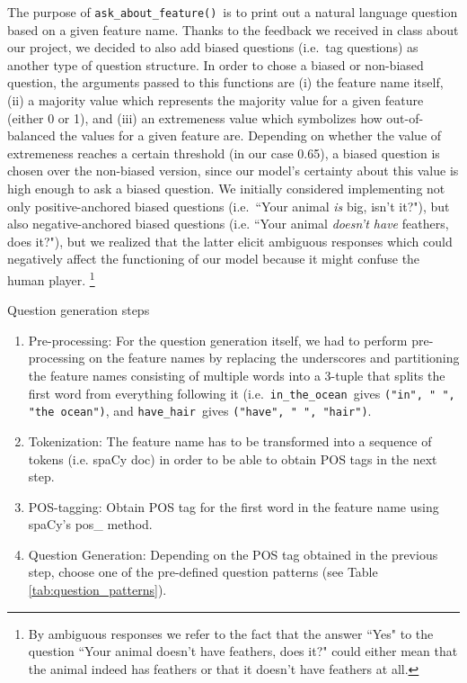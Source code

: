 \documentclass[11pt,a4paper]{article}
\newcommand{\havehair}{\texttt{have\_hair}}
\newcommand{\askaboutfeat}{\texttt{ask\_about\_feature()}}
\newcommand{\intheocean}{\texttt{in\_the\_ocean}}
\begin{document}
The purpose of \askaboutfeat \ is to print out a natural language question based on a given feature name. Thanks to the feedback we received in class about our project, we decided to also add biased questions (i.e.\ tag questions) as another type of question structure. In order to chose a biased or non-biased question, the arguments passed to this functions are (i) the feature name itself, (ii) a majority value which represents the majority value for a given feature (either 0 or 1), and (iii) an extremeness value which symbolizes how out-of-balanced the values for a given feature are. Depending on whether the value of extremeness reaches a certain threshold (in our case 0.65), a biased question is chosen over the non-biased version, since our model’s certainty about this value is high enough to ask a biased question. We initially considered implementing not only positive-anchored biased questions (i.e.\ 
``Your animal \textit{is} big, isn’t it?"), but also negative-anchored biased questions (i.e. 
``Your animal \textit{doesn't have} feathers, does it?"), but we realized that the latter elicit ambiguous responses which could negatively affect the functioning of our model because it might confuse the human player.%
    \footnote{By ambiguous responses we refer to the fact that the answer ``Yes" to the question ``Your animal doesn’t have feathers, does it?" could either mean that the animal indeed has feathers or that it doesn’t have feathers at all.}

\noindent Question generation steps
\begin{enumerate}
  \item Pre-processing: For the question generation itself, we had to perform pre-processing on the feature names by replacing the underscores and partitioning the feature names consisting of multiple words into a 3-tuple that splits the first word from everything following it (i.e.\ \intheocean\  gives \texttt{("in", " ", "the ocean")}, and \havehair\  gives \texttt{("have", " ", "hair")}.
  \item Tokenization: The feature name has to be transformed into a sequence of tokens (i.e. spaCy doc) in order to be able to obtain POS tags in the next step. 
  \item POS-tagging: Obtain POS tag for the first word in the feature name using spaCy’s pos\_ method.
  \item Question Generation: Depending on the POS tag obtained in the previous step, choose one of the pre-defined question patterns (see Table  \ref{tab:question_patterns}). 
\end{enumerate}
\end{document}
